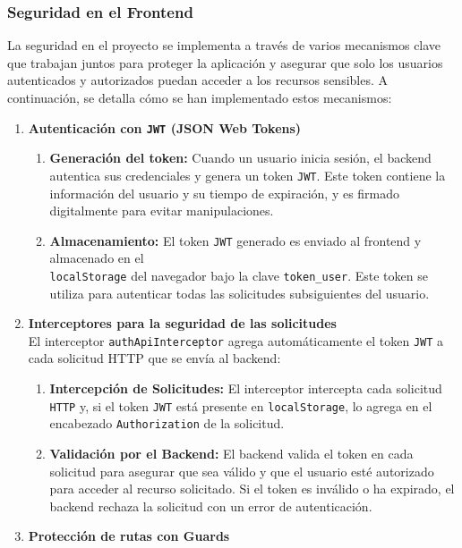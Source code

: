 \documentclass{article} %
\begin{document}
    \subsubsection{Seguridad en el Frontend}
    \noindent La seguridad en el proyecto se implementa a través de varios mecanismos clave que trabajan juntos para proteger la aplicación y asegurar que solo los usuarios autenticados y autorizados puedan acceder a los recursos sensibles. A continuación, se detalla cómo se han implementado estos mecanismos:
    \begin{enumerate}
        \item \textbf{Autenticación con \texttt{JWT} (JSON Web Tokens)}
        \begin{enumerate}
            \item \textbf{Generación del token:} Cuando un usuario inicia sesión, el backend autentica sus credenciales y genera un token \texttt{JWT}. Este token contiene la información del usuario y su tiempo de expiración, y es firmado digitalmente para evitar manipulaciones.
            \item \textbf{Almacenamiento:} El token \texttt{JWT} generado es enviado al frontend y almacenado en el \\\texttt{localStorage} del navegador bajo la clave \texttt{token\_user}. Este token se utiliza para autenticar todas las solicitudes subsiguientes del usuario.
        \end{enumerate}
        \item \textbf{Interceptores para la seguridad de las solicitudes} \\
        \noindent El interceptor \texttt{authApiInterceptor} agrega automáticamente el token \texttt{JWT} a cada solicitud HTTP que se envía al backend:
        \begin{enumerate}
            \item \textbf{Intercepción de Solicitudes:} El interceptor intercepta cada solicitud \texttt{HTTP} y, si el token \texttt{JWT} está presente en \texttt{localStorage}, lo agrega en el encabezado \texttt{Authorization} de la solicitud.
            \item \textbf{Validación por el Backend:} El backend valida el token en cada solicitud para asegurar que sea válido y que el usuario esté autorizado para acceder al recurso solicitado. Si el token es inválido o ha expirado, el backend rechaza la solicitud con un error de autenticación.
        \end{enumerate}
        \item \textbf{Protección de rutas con Guards} \\

\end{enumerate}
\end{document}
